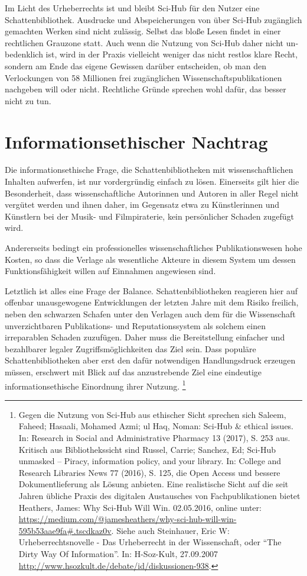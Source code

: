 \documentclass[a4paper,
fontsize=11pt,
oneside,
numbers=noperiodatend,
parskip=half-,
bibliography=totoc,
final
]{scrartcl}
\begin{document}
Im Licht des Urheberrechts ist und bleibt Sci-Hub für den Nutzer eine
Schattenbibliothek. Ausdrucke und Abspeicherungen von über Sci-Hub
zugänglich gemachten Werken sind nicht zulässig. Selbst das bloße Lesen
findet in einer rechtlichen Grauzone statt. Auch wenn die Nutzung von
Sci-Hub daher nicht un­bedenklich ist, wird in der Praxis vielleicht
weniger das nicht restlos klare Recht, sondern am Ende das eigene
Gewissen darüber entscheiden, ob man den Verlockungen von 58 Millionen
frei zugänglichen Wissenschaftspublikationen nach­geben will oder nicht.
Rechtliche Gründe sprechen wohl dafür, das besser nicht zu tun.

\section{Informationsethischer
Nachtrag}\label{informationsethischer-nachtrag}

Die informationsethische Frage, die Schattenbibliotheken mit
wissenschaftlichen Inhalten aufwerfen, ist nur vordergründig einfach zu
lösen. Einerseits gilt hier die Besonderheit, dass wissenschaftliche
Autorinnen und Autoren in aller Regel nicht vergütet werden und ihnen
daher, im Gegensatz etwa zu Künstlerinnen und Künstlern bei der Musik-
und Filmpiraterie, kein persönlicher Schaden zugefügt wird.

Andererseits bedingt ein professionelles wissenschaftliches
Publikationswesen hohe Kosten, so dass die Verlage als wesentliche
Akteure in diesem System um dessen Funktionsfähigkeit willen auf
Einnahmen angewiesen sind.

Letztlich ist alles eine Frage der Balance. Schattenbibliotheken
reagieren hier auf offenbar unausgewogene Entwicklungen der letzten
Jahre mit dem Risiko freilich, neben den schwarzen Schafen unter den
Verlagen auch dem für die Wissenschaft unverzichtbaren Publikations- und
Reputationssystem als solchem einen irreparablen Schaden zuzufügen.
Daher muss die Bereitstellung einfacher und bezahlbarer legaler
Zugriffsmöglichkeiten das Ziel sein. Dass populäre Schattenbibliotheken
aber erst den dafür notwendigen Handlungsdruck erzeugen müssen,
erschwert mit Blick auf das anzustrebende Ziel eine eindeutige
informationsethische Einordnung ihrer Nutzung. \footnote{Gegen die
  Nutzung von Sci-Hub aus ethischer Sicht sprechen sich Saleem, Faheed;
  Hasaali, Mohamed Azmi; ul Haq, Noman: Sci-Hub \& ethical issues. In:
  Research in Social and Administrative Pharmacy 13 (2017), S. 253 aus.
  Kritisch aus Bibliothekssicht sind Russel, Carrie; Sanchez, Ed;
  Sci-Hub unmasked -- Piracy, information policy, and your library. In:
  College and Research Libraries News 77 (2016), S. 125, die Open Access
  und bessere Dokumentlieferung als Lösung anbieten. Eine realistische
  Sicht auf die seit Jahren übliche Praxis des digitalen Austausches von
  Fachpublikationen bietet Heathers, James: Why Sci-Hub Will Win.
  02.05.2016, online unter:
  \url{https://medium.com/@jamesheathers/why-sci-hub-will-win-595b53aae9fa\#.tscdkaz0v}.
  Siehe auch Steinhauer, Eric W: Urheberrechtsnovelle - Das Urheberrecht
  in der Wissenschaft, oder \enquote{The Dirty Way Of Information}. In:
  H-Soz-Kult, 27.09.2007
  \url{http://www.hsozkult.de/debate/id/diskussionen-938}.}

\end{document}
